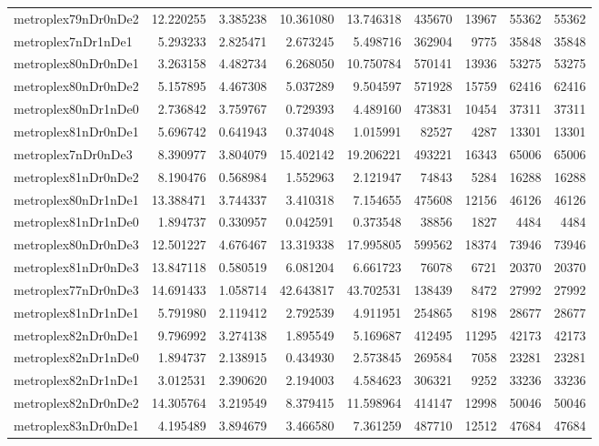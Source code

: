 \begin{longtable}{|l|r|r|r|r|r|r|r|r|}
metroplex79nDr0nDe2 & 12.220255 & 3.385238 & 10.361080 & 13.746318 & 435670 & 13967 & 55362 & 55362 \\
metroplex7nDr1nDe1 & 5.293233 & 2.825471 & 2.673245 & 5.498716 & 362904 & 9775 & 35848 & 35848 \\
metroplex80nDr0nDe1 & 3.263158 & 4.482734 & 6.268050 & 10.750784 & 570141 & 13936 & 53275 & 53275 \\
metroplex80nDr0nDe2 & 5.157895 & 4.467308 & 5.037289 & 9.504597 & 571928 & 15759 & 62416 & 62416 \\
metroplex80nDr1nDe0 & 2.736842 & 3.759767 & 0.729393 & 4.489160 & 473831 & 10454 & 37311 & 37311 \\
metroplex81nDr0nDe1 & 5.696742 & 0.641943 & 0.374048 & 1.015991 & 82527 & 4287 & 13301 & 13301 \\
metroplex7nDr0nDe3 & 8.390977 & 3.804079 & 15.402142 & 19.206221 & 493221 & 16343 & 65006 & 65006 \\
metroplex81nDr0nDe2 & 8.190476 & 0.568984 & 1.552963 & 2.121947 & 74843 & 5284 & 16288 & 16288 \\
metroplex80nDr1nDe1 & 13.388471 & 3.744337 & 3.410318 & 7.154655 & 475608 & 12156 & 46126 & 46126 \\
metroplex81nDr1nDe0 & 1.894737 & 0.330957 & 0.042591 & 0.373548 & 38856 & 1827 & 4484 & 4484 \\
metroplex80nDr0nDe3 & 12.501227 & 4.676467 & 13.319338 & 17.995805 & 599562 & 18374 & 73946 & 73946 \\
metroplex81nDr0nDe3 & 13.847118 & 0.580519 & 6.081204 & 6.661723 & 76078 & 6721 & 20370 & 20370 \\
metroplex77nDr0nDe3 & 14.691433 & 1.058714 & 42.643817 & 43.702531 & 138439 & 8472 & 27992 & 27992 \\
metroplex81nDr1nDe1 & 5.791980 & 2.119412 & 2.792539 & 4.911951 & 254865 & 8198 & 28677 & 28677 \\
metroplex82nDr0nDe1 & 9.796992 & 3.274138 & 1.895549 & 5.169687 & 412495 & 11295 & 42173 & 42173 \\
metroplex82nDr1nDe0 & 1.894737 & 2.138915 & 0.434930 & 2.573845 & 269584 & 7058 & 23281 & 23281 \\
metroplex82nDr1nDe1 & 3.012531 & 2.390620 & 2.194003 & 4.584623 & 306321 & 9252 & 33236 & 33236 \\
metroplex82nDr0nDe2 & 14.305764 & 3.219549 & 8.379415 & 11.598964 & 414147 & 12998 & 50046 & 50046 \\
metroplex83nDr0nDe1 & 4.195489 & 3.894679 & 3.466580 & 7.361259 & 487710 & 12512 & 47684 & 47684 \\

\end{longtable}
